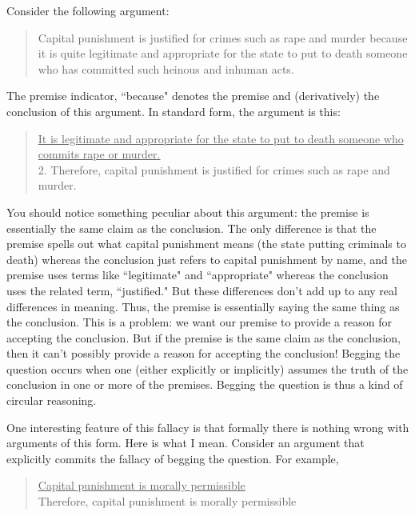 Consider the following argument:

\begin{quote}      Capital punishment is justified for crimes such as rape and murder
      because it is quite legitimate and appropriate for the state to put to
      death someone who has committed such heinous and inhuman acts.\end{quote}

The premise indicator, ``because" denotes the premise and (derivatively) the
conclusion of this argument. In standard form, the argument is this:

\begin{quote}\underline{It is legitimate and appropriate for the state to put to death someone
          who commits rape or murder.}\\
      2. Therefore, capital punishment is justified for crimes such as rape and
          murder.\end{quote}

You should notice something peculiar about this argument: the premise is
essentially the same claim as the conclusion. The only difference is that the
premise spells out what capital punishment means (the state putting criminals to
death) whereas the conclusion just refers to capital punishment by name, and
the premise uses terms like ``legitimate" and ``appropriate" whereas the
conclusion uses the related term, ``justified." But these differences don't add up
to any real differences in meaning. Thus, the premise is essentially saying the
same thing as the conclusion. This is a problem: we want our premise to
provide a reason for accepting the conclusion. But if the premise is the same
claim as the conclusion, then it can't possibly provide a reason for accepting the
conclusion! Begging the question occurs when one (either explicitly or
implicitly) assumes the truth of the conclusion in one or more of the premises.
Begging the question is thus a kind of circular reasoning.

One interesting feature of this fallacy is that formally there is nothing wrong with
arguments of this form. Here is what I mean. Consider an argument that
explicitly commits the fallacy of begging the question. For example,

        \begin{quote}\underline{Capital punishment is morally permissible} \\
       Therefore, capital punishment is morally permissible \end{quote}

